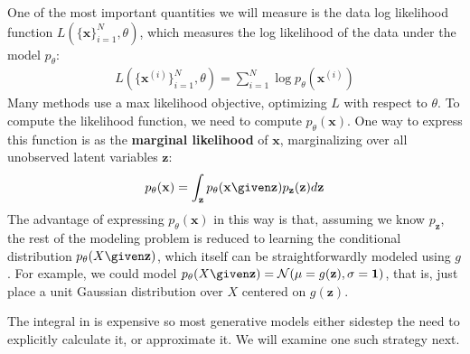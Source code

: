 One of the most important quantities we will measure is the data log likelihood function $L(\{\mathbf{x}\}_{i=1}^N, \theta)$, which measures the log likelihood of the data under the model $p_{\theta}$:
\begin{align}
    L(\{\mathbf{x}^{(i)}\}_{i=1}^N, \theta) = \sum_{i=1}^N \log p_{\theta}(\mathbf{x}^{(i)})
\end{align}
Many methods use a max likelihood objective, optimizing $L$ with respect to $\theta$. To compute the likelihood function, we need to compute $p_{\theta}(\mathbf{x})$. One way to express this function is as the \textbf{marginal likelihood} of $\mathbf{x}$, marginalizing over all unobserved latent variables $\mathbf{z}$:
\begin{align}
    p_{\theta}(\mathbf{x}) = \int_{\mathbf{z}} p_{\theta}(\mathbf{x} \given \mathbf{z})p_{\mathbf{z}}(\mathbf{z})d\mathbf{z}\label{eqn:generative_modeling_and_representation_learning:marginal_likelihood_p}
\end{align}
The advantage of expressing $p_{\theta}(\mathbf{x})$ in this way is that, assuming we know $p_{\mathbf{z}}$, the rest of the modeling problem is reduced to learning the conditional distribution $p_{\theta}(X \given \mathbf{z})$, which itself can be straightforwardly modeled using $g$. For example, we could model $p_{\theta}(X \given \mathbf{z}) = \mathcal{N}(\mu = g(\mathbf{z}), \sigma = \mathbf{1})$, that is, just place a unit Gaussian distribution over $X$ centered on $g(\mathbf{z})$.


The integral in \eqn{\ref{eqn:generative_modeling_and_representation_learning:marginal_likelihood_p}} %
is expensive so most generative models either sidestep the need to explicitly calculate it, or approximate it. We will examine one such strategy next.

